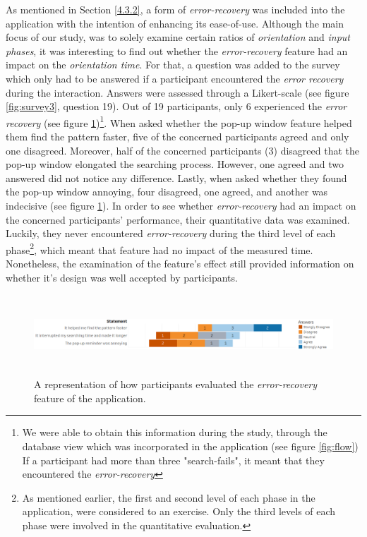 As mentioned in Section \ref{4.3.2}, a form of \textit{error-recovery} was included into the application with the intention of enhancing its ease-of-use. Although the main focus of our study, was to solely examine certain ratios of \textit{orientation} and \textit{input phases}, it was interesting to find out whether the \textit{error-recovery} feature had an impact on the \textit{orientation time}. For that, a question was added to the survey which only had to be answered if a participant encountered the \textit{error recovery} during the interaction. Answers were assessed through a Likert-scale (see figure \ref{fig:survey3}, question 19). Out of 19 participants, only 6 experienced the \textit{error recovery} (see figure \ref{fig:error})\footnote{We were able to obtain this information during the study, through the database view which was incorporated in the application (see figure \ref{fig:flow}) If a participant had more than three "search-fails", it meant that they encountered the \textit{error-recovery}}. When asked whether the pop-up window feature helped them find the pattern faster, five of the concerned participants agreed and only one disagreed. Moreover, half of the concerned participants (3) disagreed that the pop-up window elongated the searching process. However, one agreed and two answered did not notice any difference. Lastly, when asked whether they found the pop-up window annoying, four disagreed, one agreed, and another was indecisive (see figure \ref{fig:error}). In order to see whether \textit{error-recovery} had an impact on the concerned participants' performance, their quantitative data was examined. Luckily, they never encountered \textit{error-recovery} during the third level of each phase\footnote{As mentioned earlier, the first and second level of each phase in the application, were considered to an exercise. Only the third levels of each phase were involved in the quantitative evaluation.}, which meant that feature had no impact of the measured time. Nonetheless, the examination of the feature's effect still provided information on whether it's design was well accepted by participants. \\

\begin{figure}[t!]
\centering
\includegraphics[width=15cm, height=3cm]{Chapters/graphics/ErrorRecovery.png}
\caption{A representation of how participants evaluated the \textit{error-recovery} feature of the application.}
\label{fig:error}
\end{figure}

